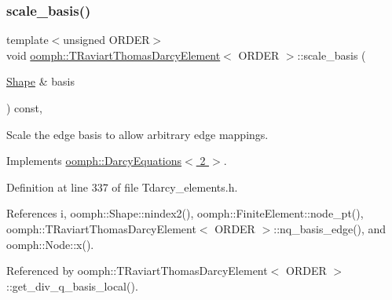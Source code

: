 \mbox{\label{classoomph_1_1TRaviartThomasDarcyElement_aafe56b344166f0c26889247b80fd76c1}} 
\subsubsection{\texorpdfstring{scale\+\_\+basis()}{scale\_basis()}}
{\footnotesize\ttfamily template$<$unsigned O\+R\+D\+ER$>$ \\
void \hyperlink{classoomph_1_1TRaviartThomasDarcyElement}{oomph\+::\+T\+Raviart\+Thomas\+Darcy\+Element}$<$ O\+R\+D\+ER $>$\+::scale\+\_\+basis (\begin{DoxyParamCaption}\item[{\hyperlink{classoomph_1_1Shape}{Shape} \&}]{basis }\end{DoxyParamCaption}) const\hspace{0.3cm}{\ttfamily [inline]}, {\ttfamily [virtual]}}



Scale the edge basis to allow arbitrary edge mappings. 



Implements \hyperlink{classoomph_1_1DarcyEquations_a2d2b51170939e5804d18d59e2f6b4222}{oomph\+::\+Darcy\+Equations$<$ 2 $>$}.



Definition at line 337 of file Tdarcy\+\_\+elements.\+h.



References i, oomph\+::\+Shape\+::nindex2(), oomph\+::\+Finite\+Element\+::node\+\_\+pt(), oomph\+::\+T\+Raviart\+Thomas\+Darcy\+Element$<$ O\+R\+D\+E\+R $>$\+::nq\+\_\+basis\+\_\+edge(), and oomph\+::\+Node\+::x().



Referenced by oomph\+::\+T\+Raviart\+Thomas\+Darcy\+Element$<$ O\+R\+D\+E\+R $>$\+::get\+\_\+div\+\_\+q\+\_\+basis\+\_\+local().

\mbox{\label{classoomph_1_1TRaviartThomasDarcyElement_a8ea07dc74e56f09716e7d556aee30d01}} 
